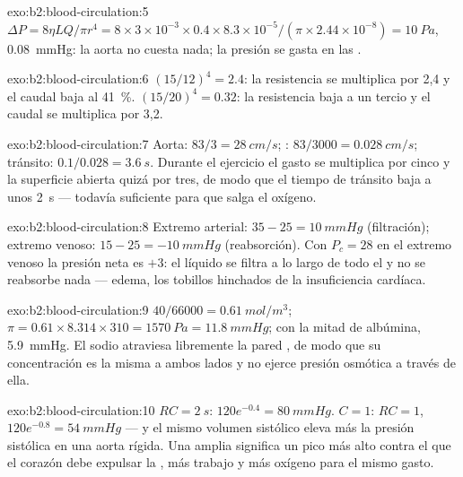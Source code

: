 \begin{solution}{exo:b2:blood-circulation:5}
$\Delta P = 8\eta LQ/\pi r^{4} = 8\times 3\times 10^{-3}\times
0.4\times 8.3\times 10^{-5}/(\pi\times 2.44\times 10^{-8}) =
\qty{10}{Pa}$, \qty{0.08}{mmHg}: la aorta no cuesta nada; la presión se
gasta en las .
\end{solution}

\begin{solution}{exo:b2:blood-circulation:6}
$(15/12)^{4} = 2.4$: la resistencia se multiplica por 2,4 y el caudal baja
al \qty{41}{\%}. $(15/20)^{4} = 0.32$: la resistencia baja a un tercio y
el caudal se multiplica por 3,2.
\end{solution}

\begin{solution}{exo:b2:blood-circulation:7}
Aorta: $83/3 = \qty{28}{cm/s}$; : $83/3000 =
\qty{0.028}{cm/s}$; tránsito: $0.1/0.028 = \qty{3.6}{s}$. Durante el
ejercicio el gasto se multiplica por cinco y la superficie  abierta
quizá por tres, de modo que el tiempo de tránsito baja a unos
\qty{2}{s} --- todavía suficiente para que salga el oxígeno.
\end{solution}

\begin{solution}{exo:b2:blood-circulation:8}
Extremo arterial: $35 - 25 = \qty{+10}{mmHg}$ (filtración); extremo
venoso: $15
- 25 = \qty{-10}{mmHg}$ (reabsorción). Con $P_c = 28$ en el extremo venoso
la presión neta es $+3$: el líquido se filtra a lo largo de todo el
 y no se reabsorbe nada --- edema, los tobillos hinchados de la
insuficiencia cardíaca.
\end{solution}

\begin{solution}{exo:b2:blood-circulation:9}
$40/66000 = \qty{0.61}{mol/m^3}$; $\pi = 0.61\times 8.314\times 310 =
\qty{1570}{Pa} = \qty{11.8}{mmHg}$; con la mitad de albúmina,
\qty{5.9}{mmHg}. El sodio atraviesa libremente la pared , de modo
que su concentración es la misma a ambos lados y no ejerce presión
osmótica a través de ella.
\end{solution}

\begin{solution}{exo:b2:blood-circulation:10}
$RC = \qty{2}{s}$: $120e^{-0.4} = \qty{80}{mmHg}$. $C = 1$: $RC = 1$,
$120e^{-0.8} = \qty{54}{mmHg}$ --- y el mismo volumen sistólico eleva más
la presión sistólica en una aorta rígida. Una  amplia
significa un pico más alto contra el que el corazón debe expulsar la
, más trabajo y más oxígeno para el mismo gasto.
\end{solution}

